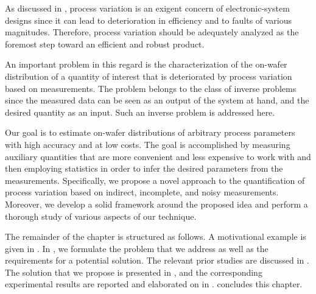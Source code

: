 As discussed in , process variation is an exigent
concern of electronic-system designs since it can lead to deterioration in
efficiency and to faults of various magnitudes. Therefore, process variation
should be adequately analyzed as the foremost step toward an efficient and
robust product.

An important problem in this regard is the characterization of the on-wafer
distribution of a quantity of interest that is deteriorated by process variation
based on measurements. The problem belongs to the class of inverse problems
since the measured data can be seen as an output of the system at hand, and the
desired quantity as an input. Such an inverse problem is addressed here.

Our goal is to estimate on-wafer distributions of arbitrary process parameters
with high accuracy and at low costs. The goal is accomplished by measuring
auxiliary quantities that are more convenient and less expensive to work with
and then employing statistics in order to infer the desired parameters from the
measurements. Specifically, we propose a novel approach to the quantification of
process variation based on indirect, incomplete, and noisy measurements.
Moreover, we develop a solid framework around the proposed idea and perform a
thorough study of various aspects of our technique.

The remainder of the chapter is structured as follows. A motivational example is
given in . In , we formulate the
problem that we address as well as the requirements for a potential solution.
The relevant prior studies are discussed in . The solution
that we propose is presented in , and the corresponding
experimental results are reported and elaborated on in .
 concludes this chapter.
